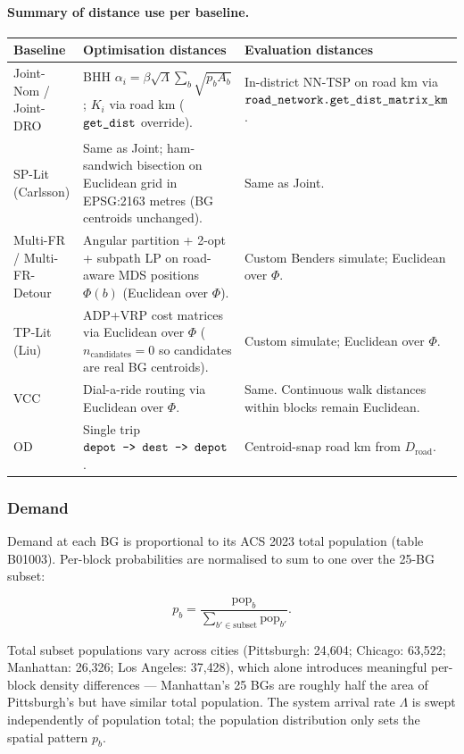 \paragraph{Summary of distance use per baseline.}
\begin{center}
\small
\begin{tabular}{l p{4.6cm} p{4.6cm}}
\toprule
Baseline & Optimisation distances & Evaluation distances \\
\midrule
Joint-Nom / Joint-DRO &
   BHH $\alpha_i = \beta\sqrt{\Lambda}\sum_b \sqrt{p_b A_b}$;
   $K_i$ via road km ($\verb|get_dist|$ override). &
   In-district NN-TSP on road km via
   $\verb|road_network.get_dist_matrix_km|$. \\
SP-Lit (Carlsson) &
   Same as Joint; ham-sandwich bisection on Euclidean grid in
   EPSG:2163 metres (BG centroids unchanged). &
   Same as Joint. \\
Multi-FR / Multi-FR-Detour &
   Angular partition + 2-opt + subpath LP on road-aware MDS
   positions $\Phi(b)$ (Euclidean over $\Phi$). &
   Custom Benders simulate; Euclidean over $\Phi$. \\
TP-Lit (Liu) &
   ADP+VRP cost matrices via Euclidean over $\Phi$
   ($n_{\mathrm{candidates}} = 0$ so candidates are real BG
   centroids). &
   Custom simulate; Euclidean over $\Phi$. \\
VCC &
   Dial-a-ride routing via Euclidean over $\Phi$. &
   Same. Continuous walk distances within blocks remain Euclidean. \\
OD &
   Single trip $\verb|depot -> dest -> depot|$. &
   Centroid-snap road km from $D_{\mathrm{road}}$. \\
\bottomrule
\end{tabular}
\end{center}

\subsubsection{Demand}

Demand at each BG is proportional to its ACS 2023 total population
(table B01003).
Per-block probabilities are normalised to sum to one over the 25-BG
subset:

\begin{equation*}
  p_b = \frac{\mathrm{pop}_b}{\sum_{b' \in \mathrm{subset}} \mathrm{pop}_{b'}}.
\end{equation*}

Total subset populations vary across cities (Pittsburgh: 24{,}604;
Chicago: 63{,}522; Manhattan: 26{,}326; Los Angeles: 37{,}428),
which alone introduces meaningful per-block density differences ---
Manhattan's 25 BGs are roughly half the area of Pittsburgh's but
have similar total population. The system arrival rate $\Lambda$
is swept independently of population total; the population
distribution only sets the spatial pattern $p_b$.

